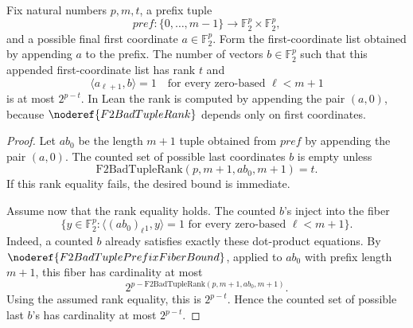 \begin{helper}
Fix natural numbers \(p,m,t\), a prefix tuple
\[
  pref:\{0,\ldots,m-1\}\to \mathbb F_2^p\times\mathbb F_2^p,
\]
and a possible final first coordinate \(a\in\mathbb F_2^p\). Form the
first-coordinate list obtained by appending \(a\) to the prefix. The number of
vectors \(b\in\mathbb F_2^p\) such that this appended first-coordinate list has
rank \(t\) and
\[
  \langle a_{\ell+1},b\rangle=1
  \quad\text{for every zero-based }\ell<m+1
\]
is at most \(2^{p-t}\). In Lean the rank is computed by appending the pair
\((a,0)\), because \(\noderef{F2BadTupleRank}\) depends only on first
coordinates.
\end{helper}
\begin{proof}
Let \(ab_0\) be the length \(m+1\) tuple obtained from \(pref\) by appending
the pair \((a,0)\). The counted set of possible last coordinates \(b\) is empty
unless
\[
  \mathrm{F2BadTupleRank}(p,m+1,ab_0,m+1)=t.
\]
If this rank equality fails, the desired bound is immediate.

Assume now that the rank equality holds. The counted \(b\)'s inject into the
fiber
\[
  \{y\in\mathbb F_2^p:
      \langle (ab_0)_\ell{}_1,y\rangle=1
      \text{ for every zero-based }\ell<m+1\}.
\]
Indeed, a counted \(b\) already satisfies exactly these dot-product equations.
By \(\noderef{F2BadTuplePrefixFiberBound}\), applied to \(ab_0\) with prefix
length \(m+1\), this fiber has cardinality at most
\[
  2^{p-\mathrm{F2BadTupleRank}(p,m+1,ab_0,m+1)}.
\]
Using the assumed rank equality, this is \(2^{p-t}\). Hence the counted set of
possible last \(b\)'s has cardinality at most \(2^{p-t}\).
\end{proof}
